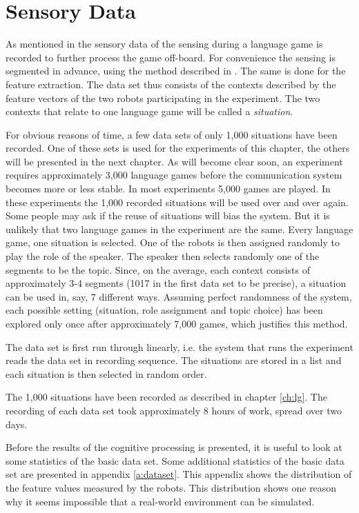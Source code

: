 \section{Sensory Data}\label{s:st:data}

As mentioned in  the sensory data of the
sensing during a language game is recorded to further
process the game off-board. For convenience the sensing is segmented in advance, using the method
described in . The same is done for the feature extraction. The data set thus consists of
the contexts described by the feature vectors of the two robots participating in the experiment. The two contexts that relate to one language game will be called a {\em situation}.


For obvious reasons of time, a few data sets of only 1,000
situations have been recorded. One of these sets is used for the experiments of this chapter, the others will be presented in the next chapter. As will become clear soon,
an experiment requires approximately 3,000 language
games before the communication system becomes more or less stable. In most experiments 5,000 games are played. In these experiments the
1,000 recorded situations will be used over and over again. Some people may ask if the reuse of situations will bias the system. But it is unlikely that two language games in the experiment are the same.
Every language game, one situation is selected. One of the
robots is then assigned randomly to play the role of the
speaker. The speaker then selects randomly one of the segments
to be the topic. Since, on the average, each context consists
of approximately 3-4 segments (1017 in the first data set to be
precise), a situation can be used in, say, 7 different ways. Assuming
perfect randomness of the system, each possible setting
(situation, role assignment and topic choice) has been explored only once
after approximately 7,000 games, which justifies this method. 

The data set is first run through linearly, i.e. the system that runs
the experiment reads the data set in recording sequence. 
The situations are stored in a list and each situation is then selected in
random order.


The 1,000 situations have been recorded as described in chapter
\ref{ch:lg}. The recording of each data set took approximately 8 hours of work,
spread over two days.



Before the results of the cognitive processing is presented, it is useful to look at some statistics of the basic data set. Some additional statistics of the basic data set are presented in appendix \ref{a:dataset}. This appendix shows the distribution of the feature values measured by the robots. This distribution shows one reason why it seems impossible that a real-world environment can be simulated.

